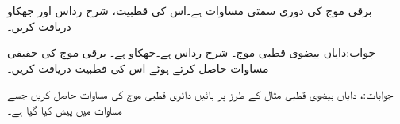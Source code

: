 برقی موج کی دوری سمتی مساوات  ہے۔اس کی قطبیت، شرح رداس اور جھکاو دریافت کریں۔

جواب:دایاں بیضوی قطبی موج۔ شرح رداس  ہے۔جھکاو  ہے۔
برقی موج  کی حقیقی مساوات حاصل کرتے ہوئے اس کی قطبیت دریافت کریں۔

جوابات:، دایاں بیضوی قطبی
مثال  کے طرز پر بائیں دائری قطبی موج کی مساوات حاصل کریں جسے مساوات  میں پیش کیا گیا ہے۔

